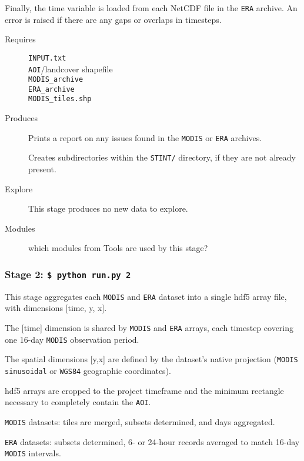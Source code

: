 \documentclass[twoside,a4paper]{refart}
\begin{document}
Finally, the time variable is loaded from each NetCDF file in the 
\texttt{ERA} archive.  An error is raised if there are any gaps 
or overlaps in timesteps.


  \begin{description}
    \item [Requires]
          \texttt{INPUT.txt} \\
          \texttt{AOI}/landcover shapefile \\
          \texttt{MODIS\_archive} \\
          \texttt{ERA\_archive} \\
          \texttt{MODIS\_tiles.shp}
      
  
  
    \item [Produces]
      Prints a report on any issues found in the 
      \texttt{MODIS} or \texttt{ERA} archives.
      
      Creates subdirectories within the \texttt{STINT/} directory, 
      if they are not already present.
      

    \item [Explore]
      This stage produces no new data to explore.

    \item [Modules]
      which modules from Tools are used by this stage?
  \end{description}
  
\subsubsection{\textbf{Stage 2:} \texttt{\$ python run.py 2}}
This stage aggregates each \texttt{MODIS} and \texttt{ERA} dataset into
a single hdf5 array file, with dimensions [time, y, x].

The [time] dimension is shared by \texttt{MODIS} and \texttt{ERA} arrays, each timestep covering one 16-day \texttt{MODIS} observation period.

The spatial dimensions [y,x] are defined by the dataset's 
native projection (\texttt{MODIS sinusoidal} or \texttt{WGS84} geographic coordinates).
        
hdf5 arrays are cropped to the project timeframe and the minimum 
rectangle necessary to completely contain the \texttt{AOI}.


\texttt{MODIS} datasets: tiles are merged, subsets determined, and days aggregated.

\texttt{ERA} datasets: subsets determined, 6- or 24-hour records averaged to match 16-day \texttt{MODIS} intervals.
\end{document}
